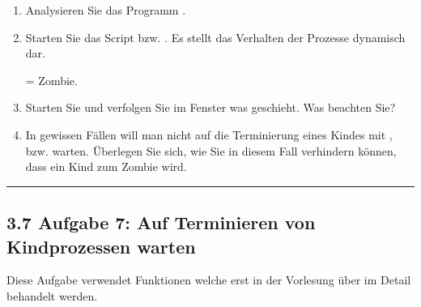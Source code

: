 \documentclass[a4paper,10pt,english]{report}
\begin{document}
\sphinxAtStartPar
{}
\begin{enumerate}
%
\item {} 
\sphinxAtStartPar
Analysieren Sie das Programm .

\item {} 
\sphinxAtStartPar
Starten Sie das Script  bzw. . Es stellt das Verhalten der Prozesse dynamisch dar.

\sphinxAtStartPar
{}  = Zombie.

\item {} 
\sphinxAtStartPar
Starten Sie  und verfolgen Sie im \sphinxhyphen{}Fenster was geschieht. Was beachten Sie?

\begin{sphinxVerbatim}[commandchars=\\\{\}]

\end{sphinxVerbatim}

\item {} 
\sphinxAtStartPar
In gewissen Fällen will man nicht auf die Terminierung eines Kindes mit , bzw.  warten. Überlegen Sie sich, wie Sie in diesem Fall verhindern können, dass ein Kind zum Zombie wird.

\begin{sphinxVerbatim}[commandchars=\\\{\}]

\end{sphinxVerbatim}

\end{enumerate}


\bigskip\hrule\bigskip



\subsection{3.7 Aufgabe 7: Auf Terminieren von Kindprozessen warten}
\label{\detokenize{P07_Prozesse_und_Threads/README:aufgabe-7-auf-terminieren-von-kindprozessen-warten}}
\sphinxAtStartPar
{} Diese Aufgabe verwendet Funktionen welche erst in der Vorlesung über  im Detail behandelt werden.
\end{document}
